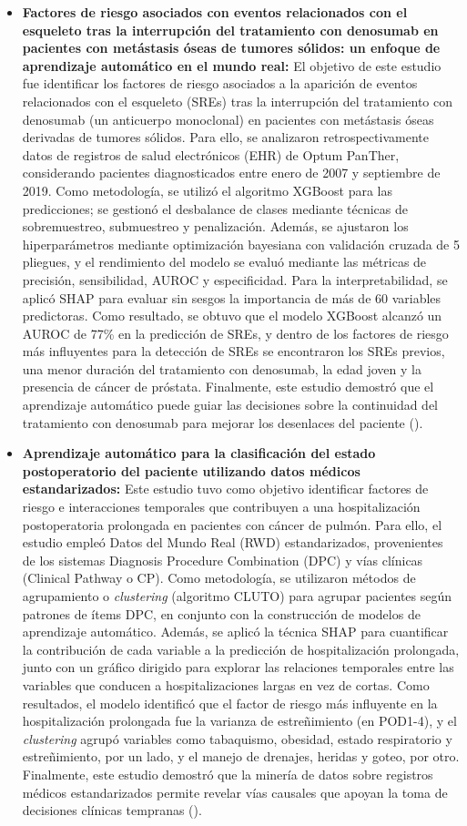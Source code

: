 \begin{itemize}
\item \textbf{Factores de riesgo asociados con eventos relacionados con el esqueleto tras la interrupción del tratamiento con denosumab en pacientes con metástasis óseas de tumores sólidos: un enfoque de aprendizaje automático en el mundo real:} El objetivo de este estudio fue identificar los factores de riesgo asociados a la aparición de eventos relacionados con el esqueleto (SREs) tras la interrupción del tratamiento con denosumab (un anticuerpo monoclonal) en pacientes con metástasis óseas derivadas de tumores sólidos. Para ello, se analizaron retrospectivamente datos de registros de salud electrónicos (EHR) de Optum PanTher, considerando pacientes diagnosticados entre enero de 2007 y septiembre de 2019. Como metodología, se utilizó el algoritmo XGBoost para las predicciones; se gestionó el desbalance de clases mediante técnicas de sobremuestreo, submuestreo y penalización. Además, se ajustaron los hiperparámetros mediante optimización bayesiana con validación cruzada de 5 pliegues, y el rendimiento del modelo se evaluó mediante las métricas de precisión, sensibilidad, AUROC y especificidad. Para la interpretabilidad, se aplicó SHAP para evaluar sin sesgos la importancia de más de 60 variables predictoras. Como resultado, se obtuvo que el modelo XGBoost alcanzó un AUROC de 77\% en la predicción de SREs, y dentro de los factores de riesgo más influyentes para la detección de SREs se encontraron los SREs previos, una menor duración del tratamiento con denosumab, la edad joven y la presencia de cáncer de próstata. Finalmente, este estudio demostró que el aprendizaje automático puede guiar las decisiones sobre la continuidad del tratamiento con denosumab para mejorar los desenlaces del paciente (\cite{article6}).
\item \textbf{Aprendizaje automático para la clasificación del estado postoperatorio del paciente utilizando datos médicos estandarizados:} Este estudio tuvo como objetivo identificar factores de riesgo e interacciones temporales que contribuyen a una hospitalización postoperatoria prolongada en pacientes con cáncer de pulmón. Para ello, el estudio empleó Datos del Mundo Real (RWD) estandarizados, provenientes de los sistemas Diagnosis Procedure Combination (DPC) y vías clínicas (Clinical Pathway o CP). Como metodología, se utilizaron métodos de agrupamiento o \textit{clustering} (algoritmo CLUTO) para agrupar pacientes según patrones de ítems DPC, en conjunto con la construcción de modelos de aprendizaje automático. Además, se aplicó la técnica SHAP para cuantificar la contribución de cada variable a la predicción de hospitalización prolongada, junto con un gráfico dirigido para explorar las relaciones temporales entre las variables que conducen a hospitalizaciones largas en vez de cortas. Como resultados, el modelo identificó que el factor de riesgo más influyente en la hospitalización prolongada fue la varianza de estreñimiento (en POD1-4), y el \textit{clustering} agrupó variables como tabaquismo, obesidad, estado respiratorio y estreñimiento, por un lado, y el manejo de drenajes, heridas y goteo, por otro. Finalmente, este estudio demostró que la minería de datos sobre registros médicos estandarizados permite revelar vías causales que apoyan la toma de decisiones clínicas tempranas (\cite{article7}).

\end{itemize}
